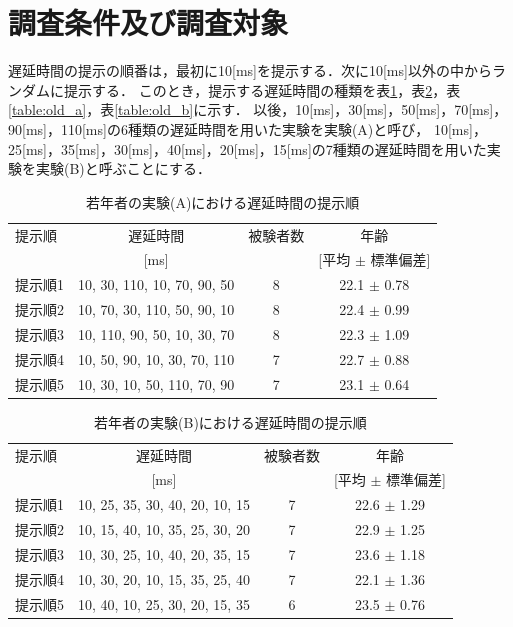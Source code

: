 \section{調査条件及び調査対象}
遅延時間の提示の順番は，最初に10[ms]を提示する．次に10[ms]以外の中からランダムに提示する．
このとき，提示する遅延時間の種類を表\ref{table:young_a}，表\ref{table:young_b}，表\ref{table:old_a}，表\ref{table:old_b}に示す．
以後，10[ms]，30[ms]，50[ms]，70[ms]，90[ms]，110[ms]の6種類の遅延時間を用いた実験を実験(A)と呼び，
10[ms]，25[ms]，35[ms]，30[ms]，40[ms]，20[ms]，15[ms]の7種類の遅延時間を用いた実験を実験(B)と呼ぶことにする．
\begin{table}[tbp]
  \caption{若年者の実験(A)における遅延時間の提示順}
  \label{table:young_a}
  \centering
  \begin{tabular}{lccc}
    \hline
    提示順 & 遅延時間 & 被験者数 & 年齢\\
    　& [ms] & & [平均 $\pm$ 標準偏差]\\
    \hline \hline
    提示順1  & 10, 30, 110, 10, 70, 90, 50  & 8 & 22.1 $\pm$ 0.78\\
    提示順2  & 10, 70, 30, 110, 50, 90, 10  & 8 & 22.4 $\pm$ 0.99\\
    提示順3  & 10, 110, 90, 50, 10, 30, 70  & 8 & 22.3 $\pm$ 1.09\\
    提示順4  & 10, 50, 90, 10, 30, 70, 110  & 7 & 22.7 $\pm$ 0.88\\
    提示順5  & 10, 30, 10, 50, 110, 70, 90  & 7 & 23.1 $\pm$ 0.64
\\
    \hline
  \end{tabular}
\end{table}
\begin{table}[tbp]
  \caption{若年者の実験(B)における遅延時間の提示順}
  \label{table:young_b}
  \centering
  \begin{tabular}{lccc}
    \hline
    提示順 & 遅延時間 & 被験者数 & 年齢\\
    　& [ms] & & [平均 $\pm$ 標準偏差]\\
    \hline \hline
    提示順1  & 10, 25, 35, 30, 40, 20, 10, 15  & 7 & 22.6 $\pm$ 1.29\\
    提示順2  & 10, 15, 40, 10, 35, 25, 30, 20  & 7 & 22.9 $\pm$ 1.25\\
    提示順3  & 10, 30, 25, 10, 40, 20, 35, 15  & 7 & 23.6 $\pm$ 1.18\\
    提示順4  & 10, 30, 20, 10, 15, 35, 25, 40  & 7 & 22.1 $\pm$ 1.36\\
    提示順5  & 10, 40, 10, 25, 30, 20, 15, 35  & 6 & 23.5 $\pm$ 0.76
\\
    \hline
  \end{tabular}
\end{table}
